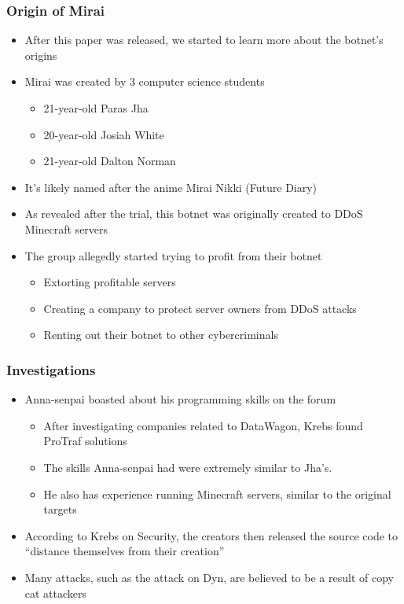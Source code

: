 \documentclass{beamer}
\begin{document}
\begin{frame}
	\frametitle{Origin of Mirai}
	\begin{itemize}
		\item After this paper was released, we started to learn more about the botnet's origins
		\item Mirai was created by 3 computer science students
		\begin{itemize}
			\item 21-year-old Paras Jha
			\item 20-year-old Josiah White
			\item 21-year-old Dalton Norman
		\end{itemize}
		\item It's likely named after the anime Mirai Nikki (Future Diary)
		\item As revealed after the trial, this botnet was originally created to DDoS Minecraft servers
		\item The group allegedly started trying to profit from their botnet
		\begin{itemize}
			\item Extorting profitable servers
			\item Creating a company to protect server owners from DDoS attacks
			\item Renting out their botnet to other cybercriminals
		\end{itemize}
	\end{itemize}
\end{frame}

\begin{frame}
	\frametitle{Investigations}
	\begin{itemize}
		\item Anna-senpai boasted about his programming skills on the forum
		\begin{itemize}
			\item After investigating companies related to DataWagon, Krebs found ProTraf solutions
			\item The skills Anna-senpai had were extremely similar to Jha's.
			\item He also has experience running Minecraft servers, similar to the original targets
		\end{itemize}
		\item According to Krebs on Security, the creators then released the source code to ``distance themselves from their creation''
		\item Many attacks, such as the attack on Dyn, are believed to be a result of copy cat attackers
	\end{itemize}
\end{frame}
\end{document}
